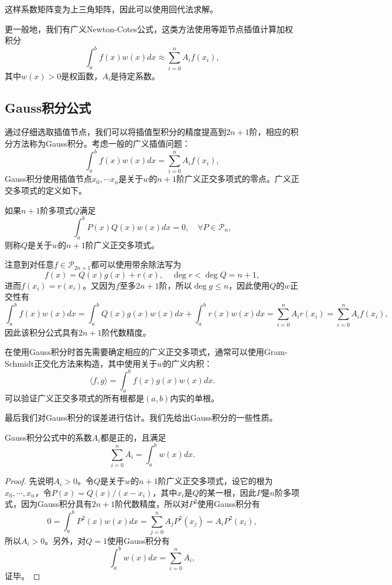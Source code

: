\documentclass[a4paper,10pt]{ctexart}
\begin{document}
这样系数矩阵变为上三角矩阵，因此可以使用回代法求解。

更一般地，我们有广义Newton-Cotes公式，这类方法使用等距节点插值计算加权积分
\begin{equation}
    \int_a^b f(x)w(x)dx \approx \sum_{i=0}^n A_i f(x_i),
\end{equation}
其中$ w(x)>0 $是权函数，$ A_i $是待定系数。

\subsection{Gauss积分公式}
通过仔细选取插值节点，我们可以将插值型积分的精度提高到$ 2n+1 $阶，相应的积分方法称为Gauss积分。考虑一般的广义插值问题：
\begin{equation}
    \int_a^b f(x)w(x)dx = \sum_{i=0}^n A_i f(x_i),
\end{equation}
Gauss积分使用插值节点$ x_0,\cdots x_n $是关于$ w $的$ n+1 $阶广义正交多项式的零点。广义正交多项式的定义如下。
\begin{definition}
    如果$ n+1 $阶多项式$ Q $满足
    \begin{equation}
        \int_a^b P(x)Q(x)w(x)dx = 0,\quad \forall P\in \mathcal{P}_n,
    \end{equation}
    则称$ Q $是关于$ w $的$ n+1 $阶广义正交多项式。
\end{definition}
注意到对任意$ f\in \mathcal{P}_{2n+1} $都可以使用带余除法写为
\[
    f(x) = Q(x)g(x) + r(x),\quad \deg r < \deg Q = n+1,
\]
进而$ f(x_i) = r(x_i) $。又因为$ f $至多$ 2n+1 $阶，所以$ \deg g \leqslant n $，因此使用$ Q $的$ w$正交性有
\begin{equation}
    \int_a^b f(x)w(x)dx = \int_a^b Q(x)g(x)w(x)dx + \int_a^b r(x)w(x)dx = \sum_{i=0}^n A_i r(x_i) = \sum_{i=0}^n A_i f(x_i),
\end{equation}
因此该积分公式具有$ 2n+1 $阶代数精度。

在使用Gauss积分时首先需要确定相应的广义正交多项式，通常可以使用Gram-Schmidt正交化方法来构造，其中使用关于$ w $的广义内积：
\begin{equation}
    \langle f,g \rangle = \int_a^b f(x)g(x)w(x)dx.
\end{equation}
可以验证广义正交多项式的所有根都是$ (a,b) $内实的单根。

最后我们对Gauss积分的误差进行估计。我们先给出Gauss积分的一些性质。
\begin{lemma}
    Gauss积分公式中的系数$ A_i $都是正的，且满足
    \begin{equation}
        \sum_{i=0}^n A_i = \int_a^b w(x)dx.
    \end{equation}
\end{lemma}
\begin{proof}
    先说明$ A_i>0 $。令$ Q $是关于$ w $的$ n+1 $阶广义正交多项式，设它的根为$ x_0,\cdots ,x_n $，令$ P(x) = Q(x) / (x-x_i) $，其中$ x_i $是$ Q $的某一根，因此$ P $是$ n $阶多项式，因为Gauss积分具有$ 2n+1 $阶代数精度，所以对$ P^2 $使用Gauss积分有
    \[
        0 = \int_a^b P^2(x)w(x)dx = \sum_{j=0}^n A_j P^2(x_j) = A_i P^2(x_i),
    \]
    所以$ A_i>0 $。另外，对$ Q=1 $使用Gauss积分有
    \[
        \int_a^b w(x)dx = \sum_{i=0}^n A_i,
    \]
    证毕。
\end{proof}
\end{document}
